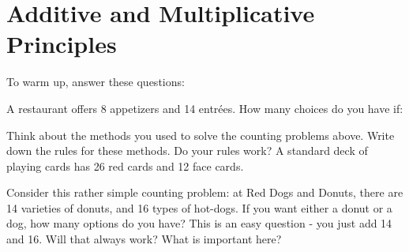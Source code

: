 \documentclass[12pt]{article}
\begin{document}
\section{Additive and Multiplicative Principles}

\begin{activity}
To warm up, answer these questions:
\begin{questions}
\question A restaurant offers 8 appetizers and 14 entr\'ees.  How many choices do you have if:
\question Think about the methods you used to solve the counting problems above.  Write down the rules for these methods.
\question Do your rules work?  A standard deck of playing cards has 26 red cards and 12 face cards.

\end{questions}

\end{activity}


Consider this rather simple counting problem: at Red Dogs and Donuts, there are 14 varieties of donuts, and 16 types of hot-dogs.  If you want either a donut or a dog, how many options do you have?  This is an easy question - you just add 14 and 16.  Will that always work?  What is important here?
\end{document}
